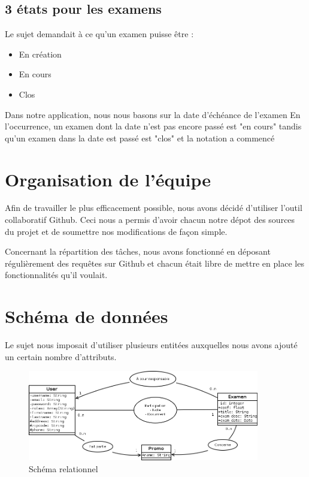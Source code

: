 \documentclass{report}
\begin{document}
      \subsection{3 états pour les examens}
        Le sujet demandait à ce qu'un examen puisse être :

        \begin{itemize}
          \item{En création}
          \item{En cours}
          \item{Clos}
        \end{itemize}

        Dans notre application, nous nous basons sur la date d'échéance de l'examen
        En l'occurrence, un examen dont la date n'est pas encore passé est "en cours"
        tandis qu'un examen dans la date est passé est "clos" et la notation a commencé
  \section{Organisation de l'équipe}
  	Afin de travailler le plus efficacement possible, nous avons décidé d'utiliser l'outil collaboratif Github. Ceci nous a permis d'avoir chacun notre dépot des sources du projet et de soumettre nos modifications de façon simple.
  	
  	Concernant la répartition des tâches, nous avons fonctionné en déposant régulièrement des requêtes sur Github et chacun était libre de mettre en place les fonctionnalités qu'il voulait.
  	
  \section{Schéma de données}
    Le sujet nous imposait d'utiliser plusieurs entitées auxquelles nous avons 
    ajouté un certain nombre d'attributs.

    \begin{figure}
      \includegraphics[width=0.9\textwidth]{./data.png}
      \caption{Schéma relationnel}
    \end{figure}
\end{document}
